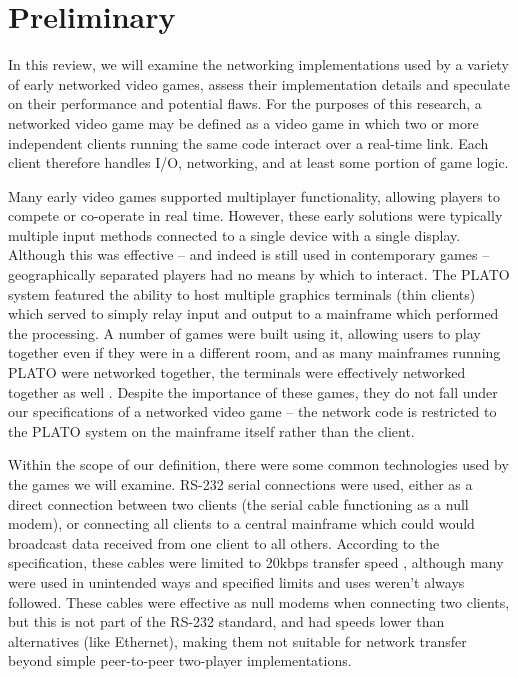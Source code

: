 \section{Preliminary}
\label{sec:pre}


In this review, we will examine the networking implementations used by a variety of early networked video games, assess their implementation details and speculate on their performance and potential flaws. For the purposes of this research, a networked video game may be defined as a video game in which two or more independent clients running the same code interact over a real-time link. Each client therefore handles I/O, networking, and at least some portion of game logic.

Many early video games supported multiplayer functionality, allowing players to compete or co-operate in real time. However, these early solutions were typically multiple input methods connected to a single device with a single display. Although this was effective -- and indeed is still used in contemporary games -- geographically separated players had no means by which to interact. 
The PLATO system featured the ability to host multiple graphics terminals (thin clients) which served to simply relay input and output to a mainframe which performed the processing. A number of games were built using it, allowing users to play together even if they were in a different room, and as many mainframes running PLATO were networked together, the terminals were effectively networked together as well \cite{plato}.
Despite the importance of these games, they do not fall under our specifications of a networked video game -- the network code is restricted to the PLATO system on the mainframe itself rather than the client.

Within the scope of our definition, there were some common technologies used by the games we will examine. RS-232 serial connections were used, either as a direct connection between two clients (the serial cable functioning as a null modem), or connecting all clients to a central mainframe which could would broadcast data received from one client to all others. According to the specification, these cables were limited to 20kbps transfer speed \cite{Buchanan2004}, although many were used in unintended ways and specified limits and uses weren't always followed. These cables were effective as null modems when connecting two clients, but this is not part of the RS-232 standard, and had speeds lower than alternatives (like Ethernet), making them not suitable for network transfer beyond simple peer-to-peer two-player implementations.


